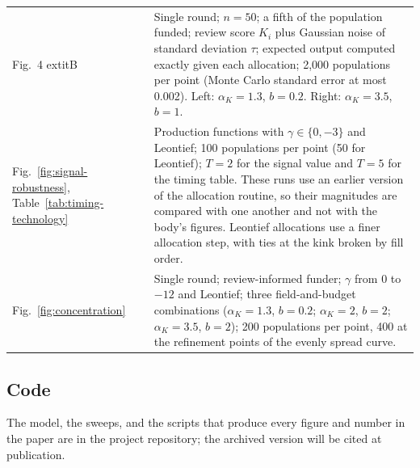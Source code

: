 \begin{table}[h]
\begin{tabular}{@{}p{2.1cm}p{10.2cm}@{}}
Fig.~4	extit{B} & Single round; $n = 50$; a fifth of the population funded; review score $K_i$ plus Gaussian noise of standard deviation $\tau$; expected output computed exactly given each allocation; 2{,}000 populations per point (Monte Carlo standard error at most 0.002). Left: $\alpha_K = 1.3$, $b = 0.2$. Right: $\alpha_K = 3.5$, $b = 1$. \\
Fig.~\ref{fig:signal-robustness}, Table~\ref{tab:timing-technology} & Production functions with $\gamma \in \{0, -3\}$ and Leontief; 100 populations per point (50 for Leontief); $T = 2$ for the signal value and $T = 5$ for the timing table. These runs use an earlier version of the allocation routine, so their magnitudes are compared with one another and not with the body's figures. Leontief allocations use a finer allocation step, with ties at the kink broken by fill order. \\
Fig.~\ref{fig:concentration} & Single round; review-informed funder; $\gamma$ from 0 to $-12$ and Leontief; three field-and-budget combinations ($\alpha_K = 1.3$, $b = 0.2$; $\alpha_K = 2$, $b = 2$; $\alpha_K = 3.5$, $b = 2$); 200 populations per point, 400 at the refinement points of the evenly spread curve. \\
\bottomrule
\end{tabular}
\end{table}

\subsection*{Code}
The model, the sweeps, and the scripts that produce every figure and number in the paper are in the project repository; the archived version will be cited at publication. %
